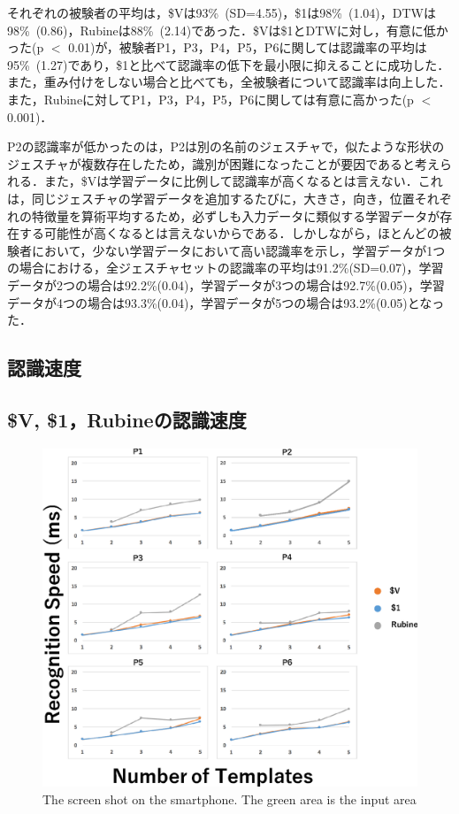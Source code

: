 それぞれの被験者の平均は，\$Vは93\%~(SD=4.55)，\$1は98\%~(1.04)，DTWは98\%~(0.86)，Rubineは88\%~(2.14)であった．\$Vは\$1とDTWに対し，有意に低かった(p $<$ 0.01)が，被験者P1，P3，P4，P5，P6に関しては認識率の平均は95\%~(1.27)であり，\$1と比べて認識率の低下を最小限に抑えることに成功した．また，重み付けをしない場合と比べても，全被験者について認識率は向上した．
また，Rubineに対してP1，P3，P4，P5，P6に関しては有意に高かった(p $<$ 0.001)．

P2の認識率が低かったのは，P2は別の名前のジェスチャで，似たような形状のジェスチャが複数存在したため，識別が困難になったことが要因であると考えられる．また，\$Vは学習データに比例して認識率が高くなるとは言えない．これは，同じジェスチャの学習データを追加するたびに，大きさ，向き，位置それぞれの特徴量を算術平均するため，必ずしも入力データに類似する学習データが存在する可能性が高くなるとは言えないからである．しかしながら，ほとんどの被験者において，少ない学習データにおいて高い認識率を示し，学習データが1つの場合における，全ジェスチャセットの認識率の平均は91.2\%(SD=0.07)，学習データが2つの場合は92.2\%(0.04)，学習データが3つの場合は92.7\%(0.05)，学習データが4つの場合は93.3\%(0.04)，学習データが5つの場合は93.2\%(0.05)となった．

\subsection{認識速度}
\subsection{\$V, \$1，Rubineの認識速度}
\begin{figure}[!h]
\centering
\includegraphics[width=1.0\columnwidth]{img/rec_speed.eps}
\caption{The screen shot on the smartphone. The green area is the input area}
\label{fig:rare_rec}
\end{figure}

